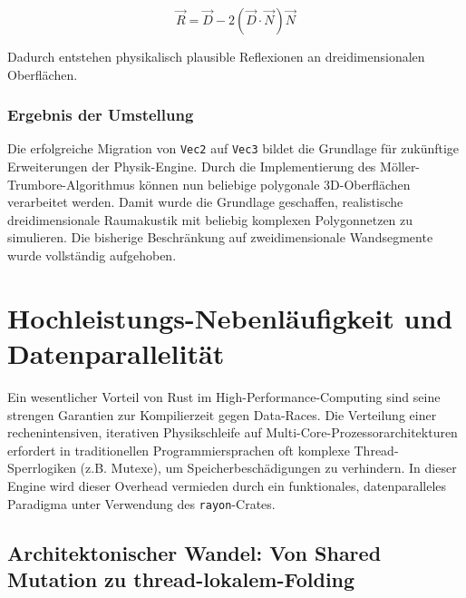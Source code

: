 \documentclass{article}
\begin{document}
    \[
    \vec{R}
    =
    \vec{D}
    -
    2(\vec{D}\cdot\vec{N})\vec{N}
    \]

    Dadurch entstehen physikalisch plausible Reflexionen an dreidimensionalen Oberflächen.

    \subsubsection{Ergebnis der Umstellung}

    Die erfolgreiche Migration von \texttt{Vec2} auf \texttt{Vec3} bildet die Grundlage für zukünftige Erweiterungen der Physik-Engine. Durch die Implementierung des Möller-Trumbore-Algorithmus können nun beliebige polygonale 3D-Oberflächen verarbeitet werden. Damit wurde die Grundlage geschaffen, realistische dreidimensionale Raumakustik mit beliebig komplexen Polygonnetzen zu simulieren. Die bisherige Beschränkung auf zweidimensionale Wandsegmente wurde vollständig aufgehoben.




    \section{Hochleistungs-Nebenläufigkeit und Datenparallelität}
    \label{sec:concurrency}


    Ein wesentlicher Vorteil von Rust im High-Performance-Computing sind seine strengen Garantien zur Kompilierzeit gegen Data-Races.
    Die Verteilung einer rechenintensiven, iterativen Physikschleife auf Multi-Core-Prozessorarchitekturen erfordert in traditionellen
    Programmiersprachen oft komplexe Thread-Sperrlogiken (z.B. Mutexe), um Speicherbeschädigungen zu verhindern.
    In dieser Engine wird dieser Overhead vermieden durch ein funktionales, datenparalleles Paradigma unter Verwendung des \texttt{rayon}-Crates.

    \subsection{Architektonischer Wandel: Von Shared Mutation zu thread-lokalem-Folding}\label{subsec:architectural-shift:-from-shared-mutation-to-thread-local-folding}
\end{document}
